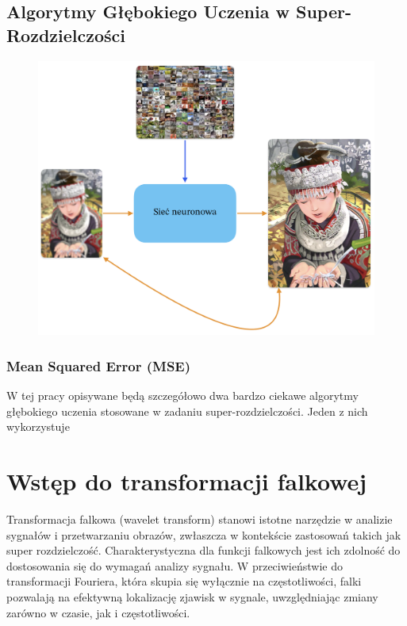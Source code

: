 \subsection*{Algorytmy Głębokiego Uczenia w Super-Rozdzielczości}

\begin{figure}[h]
    \centering
    \includegraphics[width=0.5\linewidth]{Rozdziały/02.Podstawy_teoretyczne/map_low-hi_res.png}
    \caption{}
    \label{fig:image18}
\end{figure}



\subsubsection*{Mean Squared Error (MSE)}
\cite{4775883}

W tej pracy opisywane będą szczegółowo dwa bardzo ciekawe algorytmy głębokiego uczenia stosowane w zadaniu super-rozdzielczości. Jeden z nich wykorzystuje 


\newpage
\section{Wstęp do transformacji falkowej}


Transformacja falkowa (wavelet transform) stanowi istotne narzędzie w analizie sygnałów i przetwarzaniu obrazów, zwłaszcza w kontekście zastosowań takich jak super rozdzielczość. Charakterystyczna dla funkcji falkowych jest ich zdolność do dostosowania się do wymagań analizy sygnału. W przeciwieństwie do transformacji Fouriera, która skupia się wyłącznie na częstotliwości, falki pozwalają na efektywną lokalizację zjawisk w sygnale, uwzględniając zmiany zarówno w czasie, jak i częstotliwości.

